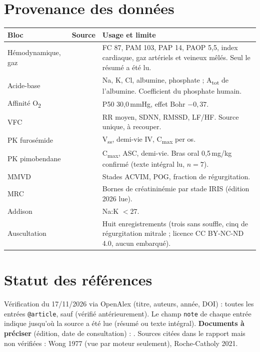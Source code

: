 \documentclass[11pt,a4paper]{article}
\begin{document}
\section{Provenance des données}
\begin{longtable}{@{}p{3.2cm}p{5.2cm}p{7.6cm}@{}}
\toprule
\textbf{Bloc} & \textbf{Source} & \textbf{Usage et limite}\\
\midrule\endhead
Hémodynamique, gaz & \citet{haskins2005} & FC 87, PAM 103, PAP 14, PAOP 5,5, index cardiaque, gaz artériels et veineux mêlés. Seul le résumé a été lu.\\
Acide-base & \citet{constable2005} & Na, K, Cl, albumine, phosphate ; A\textsubscript{tot} de l'albumine. Coefficient du phosphate humain.\\
Affinité O\textsubscript{2} & \citet{cambier2004} & P50 30,0\,mmHg, effet Bohr $-0{,}37$.\\
VFC & \citet{bogucki2015} & RR moyen, SDNN, RMSSD, LF/HF. Source unique, à recouper.\\
PK furosémide & \citet{koh2021,noah,ema1999} & V\textsubscript{ss}, demi-vie IV, C\textsubscript{max} per os.\\
PK pimobendane & \citet{her2020} & C\textsubscript{max}, ASC, demi-vie. Bras oral 0,5\,mg/kg confirmé (texte intégral lu, $n=7$).\\
MMVD & \citet{keene2019,oyama2004,msdvet} & Stades ACVIM, POG, fraction de régurgitation.\\
MRC & \citet{iris,iris2026} & Bornes de créatininémie par stade IRIS (édition 2026 lue).\\
Addison & \citet{msdvet} & Na:K $<27$.\\
Auscultation & \citet{tiho} & Huit enregistrements (trois sans souffle, cinq de régurgitation mitrale ; licence CC BY-NC-ND 4.0, aucun embarqué).\\
\bottomrule
\end{longtable}

\section{Statut des références}\label{sec:refs}
Vérification du 17/11/2026 via OpenAlex (titre, auteurs, année, DOI) : toutes les entrées \texttt{@article}, sauf \citet{dormand1980} (vérifié antérieurement). Le champ \texttt{note} de chaque entrée indique jusqu'où la source a été lue (résumé ou texte intégral). \textbf{Documents à préciser} (édition, date de consultation) : \citet{iris,msdvet,noah,ema1999,tiho}. Sources citées dans le rapport mais non vérifiées : Wong 1977 (vue par moteur seulement), Roche-Catholy 2021.



\end{document}
